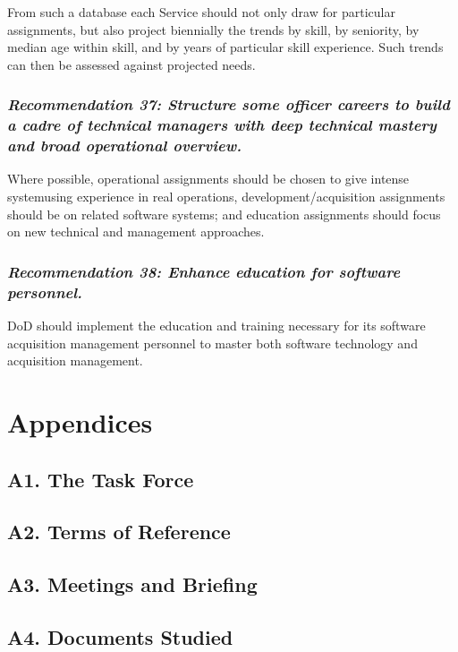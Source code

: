 \documentclass[12pt]{article}
\begin{document}
From such a database each Service should not only draw for particular
assignments, but also project biennially the trends by skill, by seniority, by
median age within skill, and by years of particular skill experience. Such
trends can then be assessed against projected needs.

\subsubsection*{\textit{Recommendation 37: Structure some officer careers to
build a cadre of technical managers with deep technical mastery and broad
operational overview.}}

Where possible, operational assignments should be chosen to give intense
systemusing experience in real operations, development/acquisition assignments
should be on related software systems; and education assignments should focus
on new technical and management approaches.

\subsubsection*{\textit{Recommendation 38: Enhance education for software
personnel.}}

DoD should implement the education and training necessary for its software
acquisition management personnel to master both software technology and
acquisition management.

\section{Appendices}

\subsection*{A1. The Task Force}

\subsection*{A2. Terms of Reference}

\subsection*{A3. Meetings and Briefing}

\subsection*{A4. Documents Studied}
\end{document}
